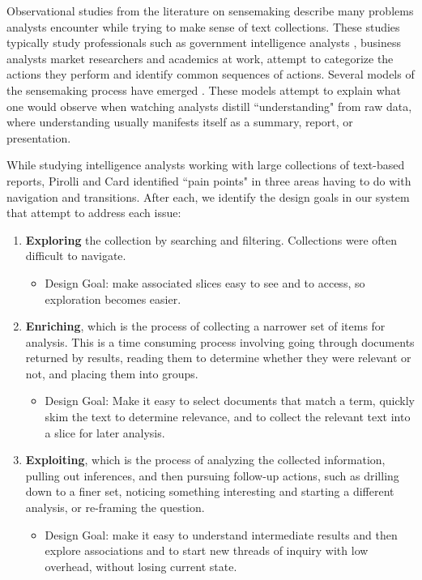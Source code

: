 \documentclass{sig-alternate}
\newcommand{\strong}[1] {\textbf{#1}}
\begin{document}
Observational studies from the literature on sensemaking describe many problems analysts encounter while trying to make sense of text collections. These studies typically study professionals such as government intelligence analysts \cite{pirolli_sensemaking_2005}, business analysts \cite{} market researchers \cite{x} and academics \cite{x} at work, attempt to categorize the actions they perform and identify common sequences of actions. Several models of the sensemaking process have emerged \cite{hearst_models_2009}. These models attempt to explain what one would observe when watching analysts distill ``understanding" from raw data, where understanding usually manifests itself as a summary, report, or presentation.

While studying intelligence analysts working with large collections of text-based reports, Pirolli and Card \cite{pirolli_sensemaking_2005} identified ``pain points" in three areas having to do with navigation and transitions. After each, we identify the design goals in our system that attempt to address each issue:
\begin{enumerate}
\item \strong{Exploring} the collection by searching and filtering. Collections were often difficult to navigate. 
	\begin{itemize}
		\item Design Goal: make associated slices  easy to see and to access, so exploration  becomes easier. 
	\end{itemize}
\item \strong{Enriching}, which is the process of collecting a narrower set of items for analysis. This is a time consuming process involving going through documents returned by results, reading them to determine whether they were relevant or not, and placing them into groups.
	\begin{itemize}
		\item Design Goal: Make it easy to select documents that match a term, quickly skim the text to determine relevance, and to collect the relevant text into a slice for later analysis.
	\end{itemize}
\item \strong{Exploiting}, which is the process of analyzing the collected information, pulling out inferences, and then pursuing  follow-up actions, such as drilling down to a finer set, noticing something interesting and starting a different analysis, or re-framing the question.
	\begin{itemize}
		\item Design Goal: make it easy to understand intermediate results and then explore associations and to start new threads of inquiry with low overhead,  without losing current state.
	\end{itemize}
\end{enumerate}
\end{document}
